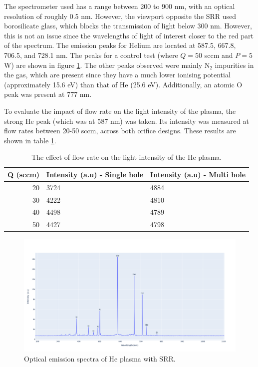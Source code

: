 The spectrometer used has a range between 200 to 900 nm, with an optical resolution of roughly 0.5 nm. However, the viewport opposite the SRR used borosilicate glass, which blocks the transmission of light below 300 nm. However, this is not an issue since the wavelengths of light of interest closer to the red part of the spectrum. The emission peaks for Helium are located at 587.5, 667.8, 706.5, and 728.1 nm. The peaks for a control test (where $Q = 50$ sccm and $P = 5$ W) are shown in figure \ref{fig:he_optical_spectra}. The other peaks observed were mainly N$_2$ impurities in the gas, which are present since they have a much lower ionising potential (approximately 15.6 eV) than that of He (25.6 eV). Additionally, an atomic O peak was present at 777 nm. 

To evaluate the impact of flow rate on the light intensity of the plasma, the strong He peak (which was at 587 nm) was taken. Its intensity was measured at flow rates between 20-50 sccm, across both orifice designs. These results are shown in table \ref{tb:light_intensity_flow_rate_he}.

\begin{table}[h!]
\centering
\caption{The effect of flow rate on the light intensity of the He plasma.}
\begin{tabular}{rll}
Q (sccm) & Intensity (a.u) - Single hole & Intensity (a.u) - Multi hole \\
\hline
20       & 3724                          & 4884                         \\
30       & 4222                          & 4810                         \\
40       & 4498                          & 4789                         \\
50       & 4427                          & 4798                        
\end{tabular}
\label{tb:light_intensity_flow_rate_he}
\end{table}

\begin{figure}[h!]
	\centering
	\includegraphics[width=\linewidth]{chapter_4/figures/he_optical_spectra.png}
	\caption{Optical emission spectra of He plasma with SRR.}
	\label{fig:he_optical_spectra}
\end{figure}



